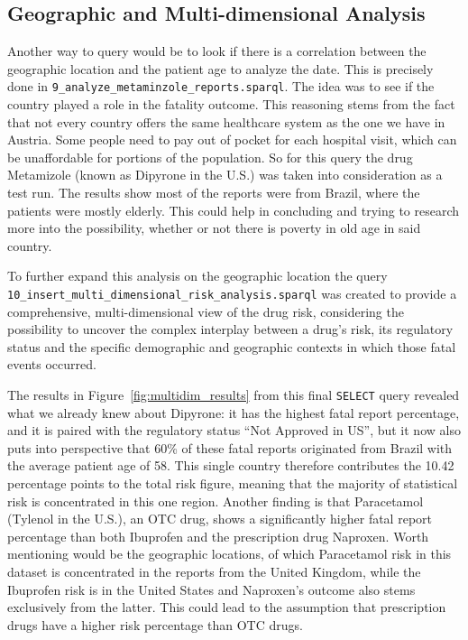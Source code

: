 \subsection{Geographic and Multi-dimensional Analysis}
Another way to query would be to look if there is a correlation between the geographic location and the patient age to analyze the date. This is precisely done in \nolinkurl{9_analyze_metaminzole_reports.sparql}. The idea was to see if the country played a role in the fatality outcome. This reasoning stems from the fact that not every country offers the same healthcare system as the one we have in Austria. Some people need to pay out of pocket for each hospital visit, which can be unaffordable for portions of the population. So for this query the drug Metamizole (known as Dipyrone in the U.S.) was taken into consideration as a test run. The results show most of the reports were from Brazil, where the patients were mostly elderly. This could help in concluding and trying to research more into the possibility, whether or not there is poverty in old age in said country.

To further expand this analysis on the geographic location the query \nolinkurl{10_insert_multi_dimensional_risk_analysis.sparql} was created to provide a comprehensive, multi-dimensional view of the drug risk, considering the possibility to uncover the complex interplay between a drug’s risk, its regulatory status and the specific demographic and geographic contexts in which those fatal events occurred.



The results in Figure~\ref{fig:multidim_results} from this final \texttt{SELECT} query revealed what we already knew about Dipyrone: it has the highest fatal report percentage, and it is paired with the regulatory status “Not Approved in US”, but it now also puts into perspective that 60\% of these fatal reports originated from Brazil with the average patient age of 58. This single country therefore contributes the 10.42 percentage points to the total risk figure, meaning that the majority of statistical risk is concentrated in this one region.
Another finding is that Paracetamol (Tylenol in the U.S.), an OTC drug, shows a significantly higher fatal report percentage than both Ibuprofen and the prescription drug Naproxen. Worth mentioning would be the geographic locations, of which Paracetamol risk in this dataset is concentrated in the reports from the United Kingdom, while the Ibuprofen risk is in the United States and Naproxen's outcome also stems exclusively from the latter. This could lead to the assumption that prescription drugs have a higher risk percentage than OTC drugs.

